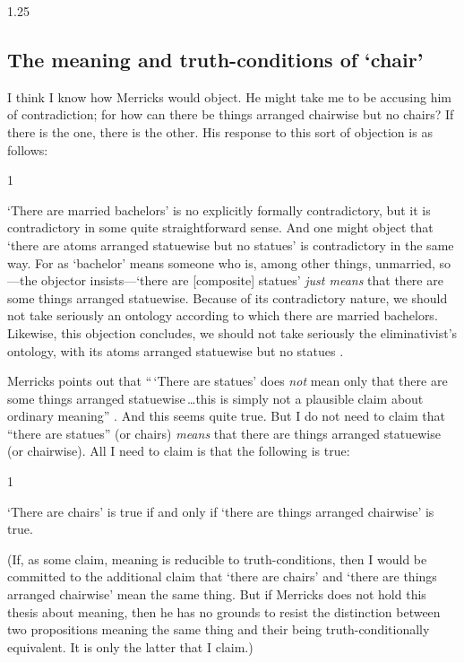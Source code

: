 \documentclass[11pt]{article}
\newenvironment{squote}{%
\begin{spacing}{1}
       	\begin{list}{}{%
\setlength{\labelwidth}{0pt}%
\rightmargin\leftmargin%
}
\item\relax
}{%
\end{list}%
\end{spacing}
}
\begin{document}
\begin{spacing}{1.25}
\subsection{The meaning and truth-conditions of `chair'}
\label{meaning}
I think I know how Merricks would object.  He might take me to be
accusing him of contradiction; for how can there be things arranged
chairwise but no chairs?  If there is the one, there is the other.
His response to this sort of objection is as follows:

\begin{squote}
`There are married bachelors' is no explicitly formally contradictory,
  but it is contradictory in some quite straightforward sense.  And
  one might object that `there are atoms arranged statuewise but no
  statues' is contradictory in the same way.  For as `bachelor' means
  someone who is, among other things, unmarried, so---the objector
  insists---`there are [composite] statues' {\em just means} that
  there are some things arranged statuewise.  Because of its
  contradictory nature, we should not take seriously an ontology
  according to which there are married bachelors.  Likewise, this
  objection concludes, we should not take seriously the
  eliminativist's ontology, with its atoms arranged statuewise but no
  statues \citeyearpar[13]{merricks2001a}.
\end{squote}

Merricks points out that ``\,`There are statues' does {\em not} mean
only that there are some things arranged statuewise\,\ldots this is
simply not a plausible claim about ordinary meaning''
\citeyearpar[13]{merricks2001a}.  And this seems quite true.  But I do
not need to claim that ``there are statues'' (or chairs) {\em means}
that there are things arranged statuewise (or chairwise).  All I need
to claim is that the following is true:

\begin{squote}
`There are chairs' is true if and only if `there are things arranged
  chairwise' is true.
\end{squote}

(If, as some claim, meaning is reducible to truth-conditions, then I
would be committed to the additional claim that `there are chairs' and
`there are things arranged chairwise' mean the same thing.  But if
Merricks does not hold this thesis about meaning, then he has no
grounds to resist the distinction between two propositions meaning the
same thing and their being truth-conditionally equivalent.  It is only
the latter that I claim.)


\end{spacing}
\end{document}
